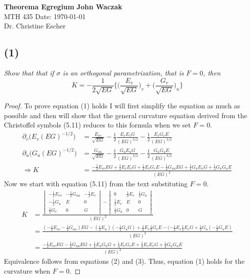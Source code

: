 \documentclass[a4paper, 11pt]{article}
\begin{document}
\noindent
\large\textbf{Theorema Egregium} \hfill \textbf{John Waczak} \\
\normalsize MTH 435 \hfill  Date: \today \\
Dr. Christine Escher \\

	
\subsection*{(1)}
	\textit{Show that that if $\sigma$ is an orthogonal parametrization, that is $F=0$, then}
		\begin{equation}
			K = -\frac{1}{2\sqrt{EG}} \Bigg\{\Big(\frac{E_v}{\sqrt{EG}}\Big)_v + \Big(\frac{G_v}{\sqrt{EG}}\Big)_u\Bigg\}
		\end{equation}
	
	\begin{proof}
		To prove equation (1) holds I will first simplify the equation as much as possible and then will show that the general curvature equation derived from the Christoffel symbols (5.11) reduces to this formula when we set $F=0$. 
			\begin{align}
				\partial_v \Big(E_v(EG)^{-1/2}\Big) &= \frac{E_{vv}}{\sqrt{EG}}-\frac{1}{2}\frac{E_vE_vG}{(EG)^{3/2}} - \frac{1}{2}\frac{E_vG_vE}{(EG)^{3/2}} \nonumber\\ 
				\partial_u \Big( G_u(EG)^{-1/2} \Big) &= \frac{G_{uu}}{\sqrt{EG}}-\frac{1}{2}\frac{G_uE_uG}{(EG)^{3/2}}-\frac{1}{2}\frac{G_uG_uE}{(EG)^{3/2}} \nonumber \\ 
				\Rightarrow K &= \frac{-\frac{1}{2}E_{vv}EG+\frac{1}{4}E_vE_vG+\frac{1}{4}E_vG_vE-\frac{1}{2}G_{uu}EG+\frac{1}{4}G_uE_uG+\frac{1}{4}G_uG_uE}{(EG)^2}
			\end{align}
		\noindent Now we start with equation (5.11) from the text substituting $F=0$. 
			\begin{align}
				K &= \frac{\begin{vmatrix}
						-\frac{1}{2}E_{vv} & -\frac{1}{2}G_{uu} & -\frac{1}{2}E_v \\
						-\frac{1}{2}G_u & E & 0 \\ 
						\frac{1}{2}G_v & 0 & G
					\end{vmatrix} -\begin{vmatrix}
						0 & \frac{1}{2}E_v & \frac{1}{2}G_u \\ 
						\frac{1}{2}E_v & E & 0 \\ 
						\frac{1}{2}G_u & 0 & G 
					\end{vmatrix}}{(EG)^2} \nonumber \\ 
				&= \frac{(-\frac{1}{2}E_{vv}-\frac{1}{2}G_{uu})EG-(\frac{1}{2}E_u)(-\frac{1}{2}G_uG)+\frac{1}{2}E_v\frac{1}{2}G_vE-(-\frac{1}{2}E_v\frac{1}{2}E_vG+\frac{1}{2}G_u(-\frac{1}{2}G_uE)}{(EG)^2} \nonumber \\ 
				&= \frac{-\frac{1}{2}E_{vv}EG-\frac{1}{2}G_{uu}EG+\frac{1}{4}E_uG_uG+\frac{1}{4}E_vG_vE + \frac{1}{4}E_vE_vG+\frac{1}{4}G_uG_uE}{(EG)^2} 
			\end{align}
		Equivalence follows from equations (2) and (3). Thus, equation (1) holds for the curvature when $F=0$. 
	\end{proof}
	
\end{document}
